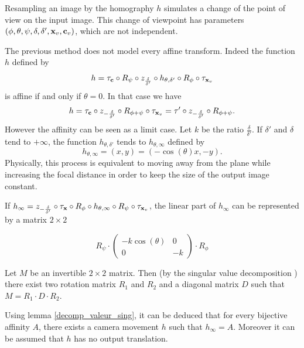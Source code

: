 \begin{remarques}
Resampling an image by the homography $h$ simulates a change of the point of view on the input image. This change of viewpoint has parameters $(\phi,\theta,\psi,\delta,\delta',\mathbf{x}_v,\mathbf{c}_v)$, which are not independent. %
\end{remarques}

\begin{remarque}
The previous method does not model every affine transform. Indeed the function $h$ defined by 
\begin{equation*}
h = \tau_{\mathbf{c}}   \circ R_{\psi} \circ z_{\frac{\delta}{\delta'}} \circ h_{\theta,\delta'} \circ R_{\phi} \circ \tau_{\mathbf{x}_v}
\end{equation*}
is affine if and only if $\theta=0$. In that case we have
\begin{equation*}
h= \tau_{\mathbf{c}} \circ z_{-\frac{\delta}{\delta'}} \circ R_{\phi+\psi} \circ \tau_{\mathbf{x}_{v}}
=\tau' \circ z_{-\frac{\delta}{\delta'}} \circ  R_{\phi+\psi}.
\end{equation*}
However the affinity can be seen as a limit case. Let $k$ be the ratio $\frac{\delta}{\delta'}$. If $\delta'$ and $\delta$ tend to $+\infty$, the function $h_{\theta,\delta'}$ tends to $h_{\theta,\infty}$ defined by
\begin{equation*}
h_{\theta,\infty}=(x,y)=(-\cos(\theta)x,-y).
\end{equation*}
Physically, this process is equivalent to moving away from the plane while increasing the focal distance in order to keep the size of the output image constant.

\noindent If $h_\infty = z_{-\frac{\delta}{\delta'}} \circ \tau_{\mathbf{x}} \circ R_{\phi} \circ h_{\theta,\infty} \circ R_{\psi} \circ \tau_{\mathbf{x}_{v}}$, the linear part of $h_{\infty}$ can be represented by a matrix $2\times2$

\begin{equation*}
R_{\psi} \cdot 
\begin{pmatrix}
-k\cos(\theta)&0\\
0&-k
\end{pmatrix}
\cdot R_{\phi}
\end{equation*}

\begin{lem}
Let $M$ be an invertible $2\times 2$ matrix. Then (by the singular value decomposition \cite{morel2009asift}) there exist two rotation matrix $R_1$ and $R_2$ and a diagonal matrix $D$ such that $M = R_1 \cdot D \cdot R_2$.
\label{decomp_valeur_sing}
\end{lem}

\noindent Using lemma \ref{decomp_valeur_sing}, it can be deduced that for every bijective affinity $A$, there exists a camera movement $h$ such that $h_\infty = A$. Moreover it can be assumed that $h$ has no output translation.
\end{remarque}

